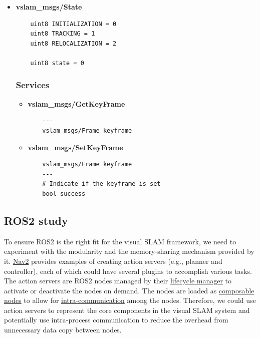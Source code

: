 \begin{itemize}
  \item \textbf{vslam\_msgs/State}
  \begin{verbatim}
    uint8 INITIALIZATION = 0
    uint8 TRACKING = 1
    uint8 RELOCALIZATION = 2
    
    uint8 state = 0
  \end{verbatim}

\subsubsection{Services}

\begin{itemize}
  \item \textbf{vslam\_msgs/GetKeyFrame}
  \begin{verbatim}
    ---
    vslam_msgs/Frame keyframe
  \end{verbatim}
\end{itemize}

\begin{itemize}
  \item \textbf{vslam\_msgs/SetKeyFrame}
  \begin{verbatim}
    vslam_msgs/Frame keyframe
    ---
    # Indicate if the keyframe is set
    bool success
  \end{verbatim}
\end{itemize}

\end{itemize}











\subsection{ROS2 study}

To ensure ROS2 is the right fit for the visual SLAM framework, we need to experiment with the modularity and the memory-sharing mechanism provided by it.
\href{https://github.com/ros-planning/navigation2}{Nav2} provides examples of creating action servers (e.g., planner and controller), each of which could have several plugins to accomplish various tasks.
The action servers are ROS2 nodes managed by their \href{https://github.com/ros2/demos/blob/humble/lifecycle/README.rst}{lifecycle manager} to activate or deactivate the nodes on demand.
The nodes are loaded as \href{https://docs.ros.org/en/humble/How-To-Guides/Launching-composable-nodes.html}{composable nodes} to allow for \href{https://docs.ros.org/en/humble/Tutorials/Demos/Intra-Process-Communication.html}{intra-communication} among the nodes.
Therefore, we could use action servers to represent the core components in the visual SLAM system and potentially use intra-process communication to reduce the overhead from unnecessary data copy between nodes.